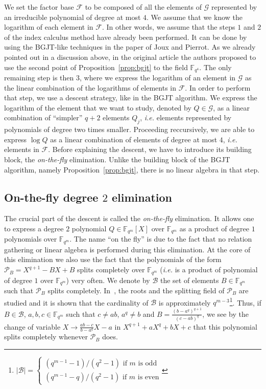 \documentclass[a4paper,11pt]{article}
\theoremstyle{break}
\theoremstyle{sc}
\theoremstyle{definition}
\theoremstyle{remark}
\newcommand{\ie}{\emph{i.e. }}
\begin{document}
We set the factor base $\mathcal F$ to be composed of all the
elements of $\mathcal G$ represented by an irreducible polynomial of degree at
most $4$. We assume that we know the logarithm of each element in
$\mathcal F$. In other words, we assume that the steps $1$ and $2$ of the index
calculus method have already been performed. It can be done by using the BGJT-like
techniques in the paper of Joux and Pierrot\cite{JP14}. As we already pointed
out in a discussion above, in the original article
the authors proposed to use the second point of
Proposition~\ref{prop:bgjt} to the field $\mathbb{F}_{q^4}$. The only remaining
step is then $3$, where we express the logarithm of an element in $\mathcal G$
as the linear combination of the logarithms of elements in $\mathcal F$. In
order to perform that step, we use a descent strategy, like in the BGJT
algorithm. We express the logarithm of the element that we want
to study, denoted by $Q\in\mathcal G$, as a linear combination of ``simpler''
$q+2$ elements $Q_j$, \ie elements represented by polynomials of degree two
times smaller. Proceeding reccursively, we are able to express $\log Q$ as a
linear combination of elements of degree at most $4$, \ie elements in $\mathcal
F$. Before explaining the descent, we have to introduce its building block, the
\emph{on-the-fly} elimination. Unlike the building block of the BGJT algorithm,
namely Proposition~\ref{prop:bgjt}, there is no linear algebra in that step.
\subsection{On-the-fly degree $2$ elimination}

The crucial part of the descent is called the \emph{on-the-fly}
elimination. It allows one to express a degree $2$ polynomial
$Q\in\mathbb{F}_{q^m}[X]$ over $\mathbb{F}_{q^m}$ as a product of degree $1$ 
polynomials over $\mathbb{F}_{q^m}$. The name ``on the fly'' is due to the fact
that no relation gathering or linear algebra is performed during this
elimination. At the core of this elimination we also use the fact that the
polynomials of the form $\mathcal P_B = X^{q+1}-BX+B$ splits completely over $\mathbb{F}_{q^m}$ (\ie is a
product of polynomial of degree $1$ over $\mathbb{F}_{q^m}$) very often. We
denote by
$\mathcal B$ the set of elements $B\in \mathbb{F}_{q^m}$ such that $\mathcal
P_B$ splits completely. In~\cite{Bluher04}, the roots and the splitting field of
$\mathcal P_B$ are studied and it is shown that the cardinality of $\mathcal B$
is approximately $q^{m-3}$\footnote{$|\mathcal B| =
  \begin{cases}(q^{m-1}-1)/(q^2-1)\text{ if }m\text{ is odd}\\
  (q^{m-1}-q)/(q^2-1)\text{ if }m\text{ is even}\end{cases}$}. Thus, if $B\in \mathcal B$,
$a,b,c\in\mathbb{F}_{q^m}$ such that $c\neq ab$, $a^q\neq b$ and
$B=\frac{(b-a^q)^{q+1}}{(c-ab)^q}$, we see by the change of variable
$X\to\frac{ab-c}{b-a^q}X-a$ in $X^{q+1}+aX^q+bX+c$ that this polynomial
splits completely whenever $\mathcal P_B$ does.
\end{document}
